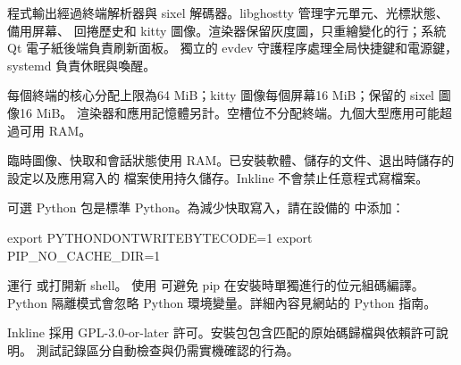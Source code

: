 程式輸出經過終端解析器與 sixel 解碼器。libghostty 管理字元單元、光標狀態、備用屏幕、
回捲歷史和 kitty 圖像。渲染器保留灰度圖，只重繪變化的行；系統 Qt 電子紙後端負責刷新面板。
獨立的 evdev 守護程序處理全局快捷鍵和電源鍵，systemd 負責休眠與喚醒。

每個終端的核心分配上限為64 MiB；kitty 圖像每個屏幕16 MiB；保留的 sixel 圖像16 MiB。
渲染器和應用記憶體另計。空槽位不分配終端。九個大型應用可能超過可用 RAM。

臨時圖像、快取和會話狀態使用 RAM。已安裝軟體、儲存的文件、退出時儲存的設定以及應用寫入的
檔案使用持久儲存。Inkline 不會禁止任意程式寫檔案。

可選 Python 包是標準 Python。為減少快取寫入，請在設備的  中添加：
\begin{shell}
export PYTHONDONTWRITEBYTECODE=1
export PIP_NO_CACHE_DIR=1
\end{shell}
運行  或打開新 shell。
使用  可避免 pip 在安裝時單獨進行的位元組碼編譯。
Python 隔離模式會忽略 Python 環境變量。詳細內容見網站的 Python 指南。

Inkline 採用 GPL-3.0-or-later 許可。安裝包包含匹配的原始碼歸檔與依賴許可說明。
測試記錄區分自動檢查與仍需實機確認的行為。
